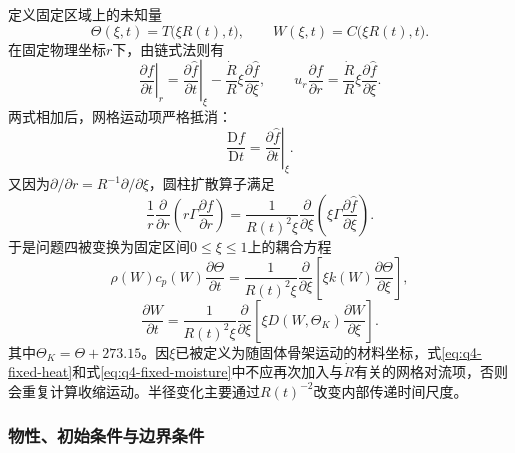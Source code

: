 \documentclass[withoutpreface,bwprint]{cumcmthesis}
\begin{document}
定义固定区域上的未知量
\begin{equation}
\Theta(\xi,t)=T\bigl(\xi R(t),t\bigr),
\qquad
W(\xi,t)=C\bigl(\xi R(t),t\bigr).
\label{eq:q4-transformed-fields}
\end{equation}
在固定物理坐标$r$下，由链式法则有
\begin{equation}
\left.\frac{\partial f}{\partial t}\right|_r
=\left.\frac{\partial\widehat f}{\partial t}\right|_\xi
-\frac{\dot R}{R}\xi
\frac{\partial\widehat f}{\partial\xi},
\qquad
u_r\frac{\partial f}{\partial r}
=\frac{\dot R}{R}\xi
\frac{\partial\widehat f}{\partial\xi}.
\label{eq:q4-chain-rule}
\end{equation}
两式相加后，网格运动项严格抵消：
\begin{equation}
\boxed{
\frac{\mathrm Df}{\mathrm Dt}
=\left.\frac{\partial\widehat f}{\partial t}\right|_\xi.
}
\label{eq:q4-material-cancellation}
\end{equation}
又因为$\partial/\partial r=R^{-1}\partial/\partial\xi$，圆柱扩散算子满足
\begin{equation}
\frac{1}{r}\frac{\partial}{\partial r}
\left(r\Gamma\frac{\partial f}{\partial r}\right)
=\frac{1}{R(t)^2\xi}
\frac{\partial}{\partial\xi}
\left(\xi\Gamma\frac{\partial\widehat f}{\partial\xi}\right).
\label{eq:q4-radial-operator-transform}
\end{equation}
于是问题四被变换为固定区间$0\le\xi\le1$上的耦合方程
\begin{equation}
\boxed{
\rho(W)c_p(W)\frac{\partial\Theta}{\partial t}
=\frac{1}{R(t)^2\xi}
\frac{\partial}{\partial\xi}
\left[\xi k(W)\frac{\partial\Theta}{\partial\xi}\right],
}
\label{eq:q4-fixed-heat}
\end{equation}
\begin{equation}
\boxed{
\frac{\partial W}{\partial t}
=\frac{1}{R(t)^2\xi}
\frac{\partial}{\partial\xi}
\left[\xi D(W,\Theta_K)\frac{\partial W}{\partial\xi}\right].
}
\label{eq:q4-fixed-moisture}
\end{equation}
其中$\Theta_K=\Theta+273.15$。因$\xi$已被定义为随固体骨架运动的材料坐标，式\eqref{eq:q4-fixed-heat}和式\eqref{eq:q4-fixed-moisture}中不应再次加入与$\dot R$有关的网格对流项，否则会重复计算收缩运动。半径变化主要通过$R(t)^{-2}$改变内部传递时间尺度。

\subsubsection{物性、初始条件与边界条件}
\end{document}
